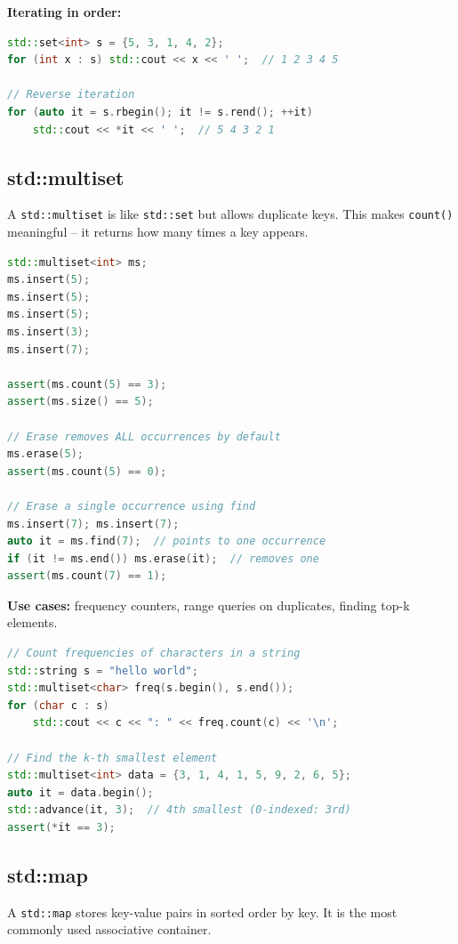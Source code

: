 \textbf{Iterating in order:}
\begin{lstlisting}[language=C++]
std::set<int> s = {5, 3, 1, 4, 2};
for (int x : s) std::cout << x << ' ';  // 1 2 3 4 5

// Reverse iteration
for (auto it = s.rbegin(); it != s.rend(); ++it)
    std::cout << *it << ' ';  // 5 4 3 2 1
\end{lstlisting}

\subsection{std::multiset}

A \texttt{std::multiset} is like \texttt{std::set} but allows duplicate keys. This makes \texttt{count()} meaningful -- it returns how many times a key appears.

\begin{lstlisting}[language=C++]
std::multiset<int> ms;
ms.insert(5);
ms.insert(5);
ms.insert(5);
ms.insert(3);
ms.insert(7);

assert(ms.count(5) == 3);
assert(ms.size() == 5);

// Erase removes ALL occurrences by default
ms.erase(5);
assert(ms.count(5) == 0);

// Erase a single occurrence using find
ms.insert(7); ms.insert(7);
auto it = ms.find(7);  // points to one occurrence
if (it != ms.end()) ms.erase(it);  // removes one
assert(ms.count(7) == 1);
\end{lstlisting}

\textbf{Use cases:} frequency counters, range queries on duplicates, finding top-k elements.

\begin{lstlisting}[language=C++]
// Count frequencies of characters in a string
std::string s = "hello world";
std::multiset<char> freq(s.begin(), s.end());
for (char c : s)
    std::cout << c << ": " << freq.count(c) << '\n';

// Find the k-th smallest element
std::multiset<int> data = {3, 1, 4, 1, 5, 9, 2, 6, 5};
auto it = data.begin();
std::advance(it, 3);  // 4th smallest (0-indexed: 3rd)
assert(*it == 3);
\end{lstlisting}

\subsection{std::map}

A \texttt{std::map} stores key-value pairs in sorted order by key. It is the most commonly used associative container.

